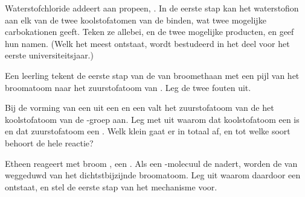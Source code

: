 \begin{exercise}[$\star\star\star$]\label{exo:g12:curly-arrows:12}
Waterstofchloride addeert aan propeen, . In de eerste stap
kan het waterstofion aan elk van de twee koolstofatomen van de  binden, wat twee mogelijke carbokationen geeft. Teken ze allebei,
en de twee mogelijke producten, en geef hun namen. (Welk het meest
ontstaat, wordt bestudeerd in het deel voor het eerste
universiteitsjaar.)
\end{exercise}

\begin{exercise}[$\star\star\star$]\label{exo:g12:curly-arrows:13}
Een leerling tekent de eerste stap van de  van broomethaan met
een pijl van het broomatoom naar het zuurstofatoom van . Leg de
twee fouten uit.
\end{exercise}

\begin{exercise}[$\star\star\star$]\label{exo:g12:curly-arrows:14}
Bij de vorming van een  uit een  en een  valt het
zuurstofatoom van de  het koolstofatoom van de -groep aan.
Leg met  uit waarom dat koolstofatoom een 
is en dat zuurstofatoom een . Welk klein  gaat er in
totaal af, en tot welke soort behoort de hele reactie?
\end{exercise}

\begin{exercise}[$\star\star\star$]\label{exo:g12:curly-arrows:15}
Etheen reageert met broom , een . Als een
-molecuul de  nadert, worden de  van
 weggeduwd van het dichtstbijzijnde broomatoom. Leg uit waarom
daardoor een  ontstaat, en stel de eerste stap van het
mechanisme voor.
\end{exercise}

